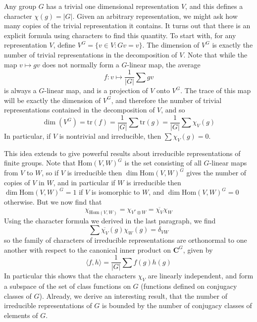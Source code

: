Any group $G$ has a trivial one dimensional representation $V$, and this defines a character $\chi(g) = |G|$. Given an arbitrary representation, we might ask how many copies of the trivial representation it contains. It turns out that there is an explicit formula using characters to find this quantity. To start with, for any representation $V$, define $V^G = \{ v \in V : Gv = v \}$. The dimension of $V^G$ is exactly the number of trivial representations in the decomposition of $V$. Note that while the map $v \mapsto gv$ does not normally form a $G$-linear map, the average
%
\[ f: v \mapsto \frac{1}{|G|} \sum gv \]
%
is always a $G$-linear map, and is a projection of $V$ onto $V^G$. The trace of this map will be exactly the dimension of $V^G$, and therefore the number of trivial representations contained in the decomposition of $V$, and so
%
\[ \dim(V^G) = \text{tr}(f) = \frac{1}{|G|} \sum \text{tr}(g) = \frac{1}{|G|} \sum \chi_V(g) \]
%
In particular, if $V$ is nontrivial and irreducible, then $\sum \chi_V(g) = 0$.

This idea extends to give powerful results about irreducible representations of finite groups. Note that $\text{Hom}(V,W)^G$ is the set consisting of all $G$-linear maps from $V$ to $W$, so if $V$ is irreducible then $\dim \text{Hom}(V,W)^G$ gives the number of copies of $V$ in $W$, and in particular if $W$ is irreducible then $\dim \text{Hom}(V,W)^G = 1$ if $V$ is isomorphic to $W$, and $\dim \text{Hom}(V,W)^G = 0$ otherwise. But we now find that
%
\[ \chi_{\text{Hom}(V,W)} = \chi_{V^* \otimes W} = \overline{\chi_V} \chi_W \]
%
Using the character formula we derived in the last paragraph, we find
%
\[ \sum \overline{\chi_V}(g) \chi_W(g) = \delta_{VW} \]
%
so the family of characters of irreducible representations are orthonormal to one another with respect to the canonical inner product on $\mathbf{C}^G$, given by
%
\[ \langle f, h \rangle = \frac{1}{|G|} \sum f(g) h(g) \]
%
In particular this shows that the characters $\chi_V$ are linearly independent, and form a subspace of the set of class functions on $G$ (functions defined on conjugacy classes of $G$). Already, we derive an interesting result, that the number of irreducible representations of $G$ is bounded by the number of conjugacy classes of elements of $G$.

